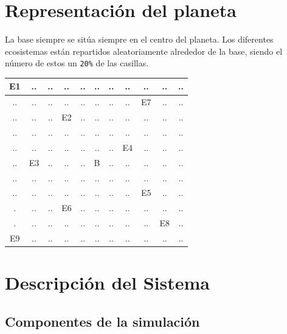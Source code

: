 \documentclass[a4paper,12pt]{article}
\begin{document}
\section{Representación del planeta}
La base siempre se sitúa siempre en el centro del planeta. Los diferentes ecosistemas están repartidos aleatoriamente alrededor de la base, siendo el número de estos un \texttt{20\%} de las casillas. 

\begin{center}
    \centering
    \begin{tabular}{|c|c|c|c|c|c|c|c|c|c|c|} \hline 
         E1&  ..&    ..&  ..&  ..&  ..&  ..&  ..&   ..& ..&..\\ \hline 
         ..&  ..&    ..&  ..&  ..&  ..&  ..&  ..&   E7& ..&..\\ \hline 
         ..&  ..&    ..&  E2&  ..&  ..&  ..&  ..&   ..& ..&..\\ \hline 
         ..&  ..&  ..&  ..&  ..&  ..&  ..&  ..&   ..& ..&  ..\\ \hline 
         ..&  ..&  ..&  ..&  ..&  ..&  ..&  E4&   ..& ..&..\\ \hline 
         ..&  E3&  ..&  ..&  ..&  B&  ..&  ..&   ..& ..&..\\ \hline 
         ..&  ..&  ..&  ..&  ..&  ..&  ..&  ..&   ..& ..&..\\ \hline 
         ..&  ..&  ..&  ..&  ..&  ..&  ..&  ..&   E5& ..&..\\ \hline 
         .&  ..&  ..&  E6&  ..&  ..&  ..&  ..&   ..& ..&..\\ \hline 
         .&  ..&  ..&  ..&  ..&  ..&  ..&  ..&   ..& E8&..\\ \hline 
        E9& ..& ..& ..& ..& ..& ..& ..& ..& ..&..\\ \hline
    \end{tabular}

    \label{tab:my_label}
\end{center}

\newpage    
\section{Descripción del Sistema}
\subsection{Componentes de la simulación}
\end{document}
